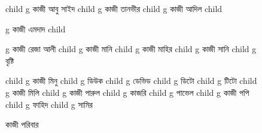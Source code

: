 \documentclass{article}
\begin{document}
\begin{figure}
{\begin{genealogypicture}
{{{{          child{    g{ কাজী আবু সাইদ }
                  child{ g{ কাজী তানভীর }
                      child{ g{ কাজী আদিল }  }
                    }
             }
          }
          child{    g{ কাজী এমদাদ } 
              child{    g{ কাজী রেজা আলী } 
                    child{    g{ কাজী মানি }
                        child{    g{ কাজী মাহির   }     }
                          }
                    child{    g{ কাজী সানি } child{    g{ বৃষ্টি }  }  }

              }
              child{    g{ কাজী মিনু  } 
              child{    g{  ডিউক }   }
              child{    g{ ডেভিড }   }
              child{    g{ ডিটো }   }
              child{    g{ টিটো }   }
              }
              child{    g{ কাজী মিলি }   }
              child{    g{ কাজী পারুল }
                  child{    g{ কাজরি }   }
                  child{    g{ পাভেল }   }
              }
              child{    g{ কাজী পপি }
                  child{    g{ ফাহিদ }   }
                  child{    g{ সামির }   }
              }

          }

      }
    }
    }
    \end{genealogypicture}
    }
    \begin{comment}
      child{
        g{ কাজী }

      }
      \end{comment}
    \caption{কাজী পরিবার}
    \end{figure}
    
\end{document}
